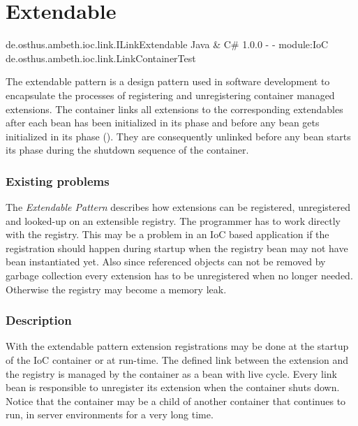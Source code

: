 \section{Extendable}
\label{feature:Extendable}

\feature
	{de.osthus.ambeth.ioc.link.ILinkExtendable}
	{Java \& C\#}
	{1.0.0}
	{-}
	{-}
	{module:IoC}
	{de.osthus.ambeth.ioc.link.LinkContainerTest}

The extendable pattern is a design pattern used in software development to encapsulate the processes of registering and unregistering container managed extensions. The container links all extensions to the corresponding extendables after each bean has been initialized in its  phase and before any bean gets initialized in its  phase (). They are consequently unlinked before any bean starts its  phase during the shutdown sequence of the container.\newline

\def\showimgref{img/Feature_Extendable}

\subsubsection{Existing problems}
The \textit{Extendable Pattern} describes how extensions can be registered, unregistered and looked-up on an extensible registry. The programmer has to work directly with the registry. This may be a problem in an IoC based application if the registration should happen during startup when the registry bean may not have bean instantiated yet. Also since referenced objects can not be removed by garbage collection every extension has to be unregistered when no longer needed. Otherwise the registry may become a memory leak.

\subsubsection{Description}
With the extendable pattern extension registrations may be done at the startup of the IoC container or at run-time. The defined link between the extension and the registry is managed by the container as a bean with live cycle. Every link bean is responsible to unregister its extension when the container shuts down. Notice that the container may be a child of another container that continues to run, in server environments for a very long time.\newline

